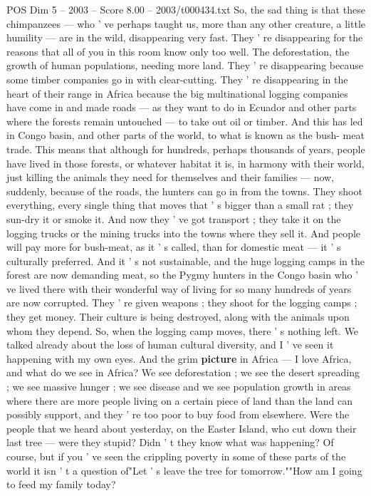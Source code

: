 \begin{textsample}{POS Dim 5 – 2003 – Score 8.00 – 2003/t000434.txt}
So, the sad thing is that these chimpanzees — who ' ve perhaps taught us, more than any other creature, a little humility — are in the wild, disappearing very fast.
They ' re disappearing for the reasons that all of you in this room know only too well.
The deforestation, the growth of human populations, needing more land.
They ' re disappearing because some timber companies go in with clear-cutting.
They ' re disappearing in the heart of their range in Africa because the big multinational logging companies have come in and made roads — as they want to do in Ecuador and other parts where the forests remain untouched — to take out oil or timber.
And this has led in Congo basin, and other parts of the world, to what is known as the bush- meat trade.
This means that although for hundreds, perhaps thousands of years, people have lived in those forests, or whatever habitat it is, in harmony with their world, just killing the animals they need for themselves and their families — now, suddenly, because of the roads, the hunters can go in from the towns.
They shoot everything, every single thing that moves that ' s bigger than a small rat ; they sun-dry it or smoke it.
And now they ' ve got transport ; they take it on the logging trucks or the mining trucks into the towns where they sell it.
And people will pay more for bush-meat, as it ' s called, than for domestic meat — it ' s culturally preferred.
And it ' s not sustainable, and the huge logging camps in the forest are now demanding meat, so the Pygmy hunters in the Congo basin who ' ve lived there with their wonderful way of living for so many hundreds of years are now corrupted.
They ' re given weapons ; they shoot for the logging camps ; they get money.
Their culture is being destroyed, along with the animals upon whom they depend.
So, when the logging camp moves, there ' s nothing left.
We talked already about the loss of human cultural diversity, and I ' ve seen it happening with my own eyes.
And the grim \textbf{picture} in Africa — I love Africa, and what do we see in Africa?
We see deforestation ; we see the desert spreading ; we see massive hunger ; we see disease and we see population growth in areas where there are more people living on a certain piece of land than the land can possibly support, and they ' re too poor to buy food from elsewhere.
Were the people that we heard about yesterday, on the Easter Island, who cut down their last tree — were they stupid?
Didn ' t they know what was happening?
Of course, but if you ' ve seen the crippling poverty in some of these parts of the world it isn ' t a question of"Let ' s leave the tree for tomorrow.""How am I going to feed my family today?

\end{textsample}
